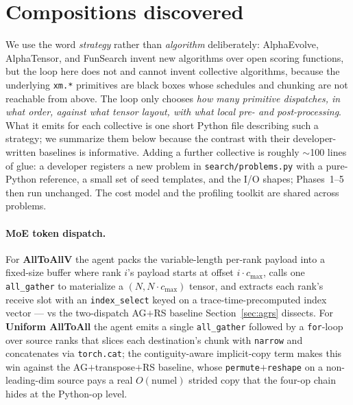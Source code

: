\section{Compositions discovered}
\label{sec:algos}

We use the word \emph{strategy} rather than \emph{algorithm}
deliberately: AlphaEvolve, AlphaTensor, and FunSearch invent new
algorithms over open scoring functions, but the loop here does not
and cannot invent collective algorithms, because the underlying
\texttt{xm.*} primitives are black boxes whose schedules and chunking
are not reachable from above. The loop only chooses \emph{how many
primitive dispatches, in what order, against what tensor layout,
with what local pre- and post-processing}. What it emits for each
collective is one short Python file describing such a strategy;
we summarize them below because the contrast with their
developer-written baselines is informative. Adding a further
collective is roughly $\sim$100 lines of glue: a developer
registers a new problem in \texttt{search/problems.py} with a
pure-Python reference, a small set of seed templates, and the I/O
shapes; Phases~1--5 then run unchanged. The cost model and the
profiling toolkit are shared across problems.

\paragraph{MoE token dispatch.} For \textbf{AllToAllV} the agent
packs the variable-length per-rank payload into a fixed-size buffer
where rank $i$'s payload starts at offset $i \cdot c_{\max}$, calls
one \texttt{all\_gather} to materialize a $(N, N \cdot c_{\max})$
tensor, and extracts each rank's receive slot with an
\texttt{index\_select} keyed on a trace-time-precomputed index vector
--- vs the two-dispatch AG$+$RS baseline Section~\ref{sec:agrs}
dissects. For \textbf{Uniform AllToAll} the agent emits a single
\texttt{all\_gather} followed by a \texttt{for}-loop over source
ranks that slices each destination's chunk with \texttt{narrow} and
concatenates via \texttt{torch.cat}; the contiguity-aware
implicit-copy term makes this win against the AG$+$transpose$+$RS
baseline, whose \texttt{permute$+$reshape} on a non-leading-dim
source pays a real $O(\text{numel})$ strided copy that the four-op
chain hides at the Python-op level.

